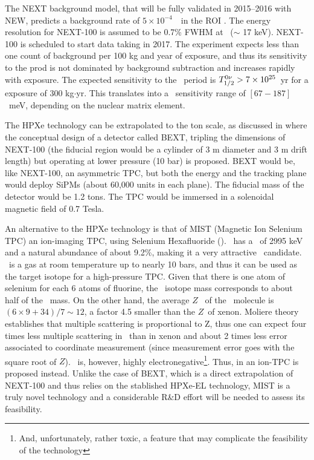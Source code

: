 \documentclass{JINST}
\begin{document}
 The NEXT background model, that will be fully validated in 2015--2016 with NEW, predicts a background rate of $5 \times 10^{-4}$~\ckky\ in the ROI \cite{Nebot-Guinot:2014raa}. The energy resolution for NEXT-100 is assumed to be 0.7\% FWHM at \Qbb\ ($\sim$ 17 keV). NEXT-100 is scheduled to start data taking in 2017. The experiment expects less than one count of background per 100 kg and year of exposure, and thus its sensitivity to the prod is not dominated by background subtraction and increases rapidly with exposure. The expected sensitivity to the \bbonu\ period is $T_{1/2}^{0\nu} > 7 \times 10^{25}$~yr for a exposure of 300 kg$\cdot$yr. This translates into a \mbb\ sensitivity range of $[67-187]$~meV, depending on the nuclear matrix element.

 The HPXe technology can be extrapolated to the ton scale, as discussed in \cite{Gomez-Cadenas:2015bext} where the conceptual design of a detector called BEXT, tripling the dimensions of NEXT-100 (the fiducial region would be a cylinder of 3 m diameter and 3 m drift length) but operating at lower pressure (10 bar) is proposed.  BEXT would be, like NEXT-100, an asymmetric TPC, but both the energy and the tracking plane would deploy SiPMs (about 60,000 units in each plane). The fiducial mass of the detector would be 1.2 tons. The TPC would be immersed in a solenoidal magnetic field of 0.7 Tesla.  
 
 An alternative to the HPXe technology is that of MIST (Magnetic Ion Selenium TPC) \cite{Nygren:2015mist} an ion-imaging TPC, using Selenium Hexafluoride (\SEHF). \SE\ has a \Qbb\ of 2995 keV and a natural abundance of about 9.2\%, making it a very attractive \bbonu\ candidate.  \SEHF\ is a gas at room temperature up to nearly 10 bars, and thus it can be used as the target isotope for a high-pressure TPC. Given that there is one atom of selenium for each 6 atoms of fluorine, the \SE\ isotope mass corresponds to about half of the \SEHF~mass. On the other hand, the average $Z$~ of the \SEHF\ molecule is $(6 \times 9 + 34)/7 \sim12$, a factor 4.5 smaller than the $Z$~of xenon. Moliere  theory establishes that multiple scattering is proportional to Z, thus one can expect four times less multiple scattering in \SEHF\ than in xenon and about 2 times less error associated to coordinate measurement (since measurement error goes with the square root of $Z$).  \SEHF\  is, however, highly electronegative\footnote{And, unfortunately, rather toxic, a feature that may complicate the feasibility of the technology}. Thus, in \cite{Nygren:2015mist} an ion-TPC is proposed instead. Unlike the case of BEXT, which is a direct extrapolation of NEXT-100 and thus relies on the stablished HPXe-EL technology, MIST is a truly novel technology and a considerable R\&D effort will be needed to assess its feasibility. 
 
\end{document}

